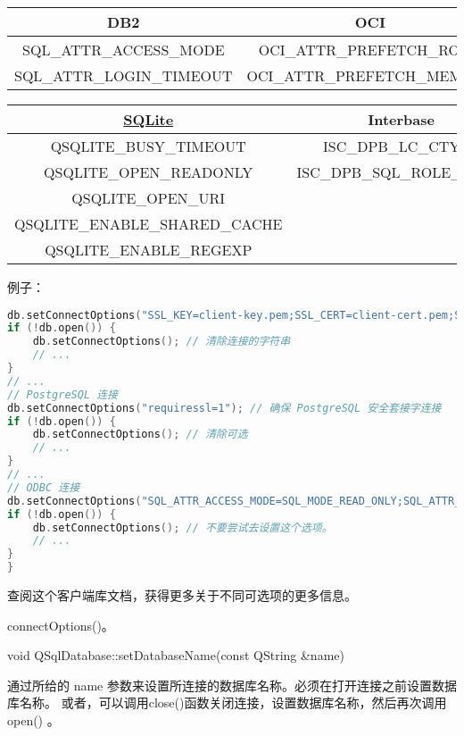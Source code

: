 \begin{tabular}{|c|c|c|}
	\hline
	DB2	&OCI	&TDS \\ 
	\hline
	SQL\_ATTR\_ACCESS\_MODE & OCI\_ATTR\_PREFETCH\_ROWS	& 无 \\
	\hline
	SQL\_ATTR\_LOGIN\_TIMEOUT & OCI\_ATTR\_PREFETCH\_MEMORY& \\	
	\hline
\end{tabular}

\begin{tabular}{|c|c|}
	\hline
	\href{https://doc.qt.io/qt-5/qtsql-attribution-sqlite.html#sqlite}{SQLite} & Interbase \\ 
	\hline
	QSQLITE\_BUSY\_TIMEOUT & ISC\_DPB\_LC\_CTYPE \\ 
	\hline
	QSQLITE\_OPEN\_READONLY	& ISC\_DPB\_SQL\_ROLE\_NAME \\ 
	\hline
	QSQLITE\_OPEN\_URI&	\\ 
	\hline
	QSQLITE\_ENABLE\_SHARED\_CACHE	& \\
	\hline
	QSQLITE\_ENABLE\_REGEXP &  \\
	\hline
\end{tabular}

\clearpage

例子：

\begin{lstlisting}[language=C++]
db.setConnectOptions("SSL_KEY=client-key.pem;SSL_CERT=client-cert.pem;SSL_CA=ca-cert.pem;CLIENT_IGNORE_SPACE=1"); // 使用安全套连字进行连接
if (!db.open()) {
	db.setConnectOptions(); // 清除连接的字符串
	// ...
}
// ...
// PostgreSQL 连接
db.setConnectOptions("requiressl=1"); // 确保 PostgreSQL 安全套接字连接
if (!db.open()) {
	db.setConnectOptions(); // 清除可选
	// ...
}
// ...
// ODBC 连接
db.setConnectOptions("SQL_ATTR_ACCESS_MODE=SQL_MODE_READ_ONLY;SQL_ATTR_TRACE=SQL_OPT_TRACE_ON"); // 设置 ODBC 连项
if (!db.open()) {
	db.setConnectOptions(); // 不要尝试去设置这个选项。
	// ...
}
}
\end{lstlisting}

查阅这个客户端库文档，获得更多关于不同可选项的更多信息。

\begin{seeAlso}
connectOptions()。
\end{seeAlso}



void QSqlDatabase::setDatabaseName(const QString \&name)

通过所给的 name 参数来设置所连接的数据库名称。必须在打开连接之前设置数据库名称。 或者，可以调用close()函数关闭连接，设置数据库名称，然后再次调用open() 。

